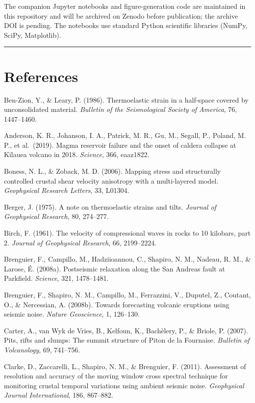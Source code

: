 \documentclass[12pt]{article}
\begin{document}
The companion Jupyter notebooks and figure-generation code are
maintained in this repository and will be archived on Zenodo before
publication; the archive DOI is pending. The notebooks use standard
Python scientific libraries (NumPy, SciPy, Matplotlib).

\begin{center}\rule{0.5\linewidth}{0.5pt}\end{center}

\section{References}\label{references}

Ben-Zion, Y., \& Leary, P. (1986). Thermoelastic strain in a half-space
covered by unconsolidated material. \emph{Bulletin of the Seismological
Society of America}, 76, 1447--1460.

Anderson, K. R., Johanson, I. A., Patrick, M. R., Gu, M., Segall, P.,
Poland, M. P., et al.~(2019). Magma reservoir failure and the onset of
caldera collapse at Kīlauea volcano in 2018. \emph{Science}, 366,
eaaz1822.

Boness, N. L., \& Zoback, M. D. (2006). Mapping stress and structurally
controlled crustal shear velocity anisotropy with a multi-layered model.
\emph{Geophysical Research Letters}, 33, L01304.

Berger, J. (1975). A note on thermoelastic strains and tilts.
\emph{Journal of Geophysical Research}, 80, 274--277.

Birch, F. (1961). The velocity of compressional waves in rocks to 10
kilobars, part 2. \emph{Journal of Geophysical Research}, 66,
2199--2224.

Brenguier, F., Campillo, M., Hadziioannou, C., Shapiro, N. M., Nadeau,
R. M., \& Larose, É. (2008a). Postseismic relaxation along the San
Andreas fault at Parkfield. \emph{Science}, 321, 1478--1481.

Brenguier, F., Shapiro, N. M., Campillo, M., Ferrazzini, V., Duputel,
Z., Coutant, O., \& Nercessian, A. (2008b). Towards forecasting volcanic
eruptions using seismic noise. \emph{Nature Geoscience}, 1, 126--130.

Carter, A., van Wyk de Vries, B., Kelfoun, K., Bachèlery, P., \& Briole,
P. (2007). Pits, rifts and slumps: The summit structure of Piton de la
Fournaise. \emph{Bulletin of Volcanology}, 69, 741--756.

Clarke, D., Zaccarelli, L., Shapiro, N. M., \& Brenguier, F. (2011).
Assessment of resolution and accuracy of the moving window cross
spectral technique for monitoring crustal temporal variations using
ambient seismic noise. \emph{Geophysical Journal International}, 186,
867--882.
\end{document}
